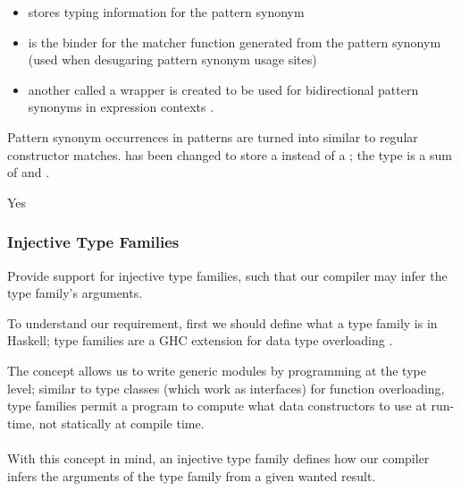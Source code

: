 \begin{itemize}
    \item {} stores typing information for the pattern synonym
    \item {} is the binder for the matcher function generated from the pattern synonym (used when desugaring pattern synonym usage sites)
    \item another  called a wrapper is created to be used for bidirectional pattern synonyms in expression contexts \cite{wiki}.
\end{itemize}

Pattern synonym occurrences in patterns are turned into  similar to regular constructor matches.  has been changed to store a  instead of a ; the  type is a sum of  and .

\begin{new}
Yes
\end{new}


\subsubsection{Injective Type Families}

\begin{requirement}
Provide support for injective type families, such that our compiler may infer the type family's arguments.
\end{requirement}

To understand our requirement, first we should define what a type family is in Haskell; type families are a GHC extension for data type overloading  \cite{wiki}. 


\begin{explication}
The concept allows us to write generic modules by programming at the type level; similar to type classes (which work as interfaces) for function overloading, type families permit a program to compute what data constructors to use at run-time, not statically at compile time.
\\\\
With this concept in mind, an injective type family defines how our compiler infers the arguments of the type family from a given wanted result.
\end{explication}

 \\
 \\
 \\

